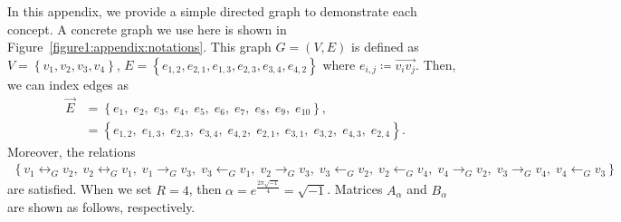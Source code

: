 \documentclass{article}
\theoremstyle{plain}
\begin{document}
In this appendix, we provide a simple directed graph to demonstrate each concept. A concrete graph we use here is shown in Figure~\ref{figure1:appendix:notations}.
This graph $G=(V,E)$ is defined as $V = \left\{ v_1, v_2, v_3, v_4 \right\}$, $E = \left\{ e_{1,2}, e_{2,1}, e_{1,3}, e_{2,3}, e_{3,4}, e_{4,2} \right\}$
where $e_{i,j} \coloneqq \overrightarrow{v_i v_j}$. Then, we can index edges as
\begin{align*}
	\vec{E}
	 & = \left\{
	e_1,\; e_2,\; e_3,\; e_4,\; e_5,\;
	e_6,\; e_7,\; e_8,\; e_9,\; e_{10}
	\right\}
	,            \\
	 & = \left\{
	e_{1,2},\; e_{1,3},\; e_{2,3},\; e_{3,4},\; e_{4,2},\;
	e_{2,1},\; e_{3,1},\; e_{3,2},\; e_{4,3},\; e_{2,4}
	\right\}
	.
\end{align*}
Moreover, the relations
\begin{align*}
	\left\{
	v_1 \leftrightarrow_{G} v_2,\; v_2 \leftrightarrow_{G} v_1,\;
	v_1 \rightarrow_{G} v_3,\; v_3 \leftarrow_{G} v_1,\;
	v_2 \rightarrow_{G} v_3,\; v_3 \leftarrow_{G} v_2,\;
	v_2 \leftarrow_{G} v_4,\; v_4 \rightarrow_{G} v_2,\;
	v_3 \rightarrow_{G} v_4,\; v_4 \leftarrow_{G} v_3
	\right\}
\end{align*}
are satisfied.
When we set $R=4$, then $\alpha = e^{\frac{2\pi \sqrt{-1}}{4}} = \sqrt{-1}$.
Matrices $A_{\alpha}$ and $B_{\alpha}$ are shown as follows, respectively.
\end{document}

